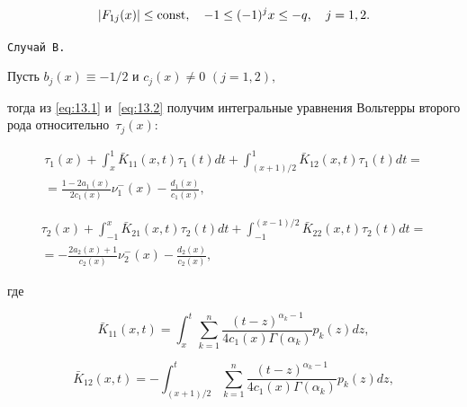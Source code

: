 \begin{equation}

| F_{1j}(x) | \le {\rm const},\quad  -1\leq(-1)^{j}x\leq -q, \quad  j = 1, 2. \label{eq:28.1.j}

\end{equation}



\smallskip



\hypertarget{abd:B}{}



\texttt{Случай B.}

Пусть ${b_j}(x) \equiv  - {1}/{2}$ и ${c_j}(x) \ne 0$ $(j = 1, 2),$ 

тогда из \eqref{eq:13.1} и~\eqref{eq:13.2} получим интегральные уравнения Вольтерры второго рода относительно~${\tau _j}(x)$:

\begin{multline}

{\tau _1}(x) +  \int _x^1 {{{\bar K}_{11}}(x,t){\tau _1}(t)dt}  +  \int _{({{x + 1}})/{2}}^1 {{{\bar K}_{12}}(x,t){\tau _1}(t)dt} =

\\

 = \frac{{1 - 2{a_1}(x)}}{{2{c_1}(x)}}\nu _1^ - (x) - \frac{{{d_1}(x)}}{{{c_1}(x)}}, \label{eq:29.1}

\end{multline}

\begin{multline}

{\tau _2}(x) +  \int _{ - 1}^x {{{\bar K}_{21}}(x,t){\tau _2}(t)dt}  +  \int _{ - 1}^{({{x - 1}})/{2}} {{{\bar K}_{22}}(x,t){\tau _2}(t)dt} =

\\  =  - \frac{{2{a_2}(x) + 1}}{{{c_2}(x)}}\nu _2^ - (x) - \frac{{{d_2}(x)}}{{{c_2}(x)}},\label{eq:29.2}

\end{multline}

где

$$

{\bar K_{11}}(x,t) =  \int _x^t {\sum\limits_{k = 1}^n {\frac{{{{(t - z)}^{{\alpha _k} - 1}}}}{{4{c_1}(x)\Gamma ({\alpha _k})}}} {p_k}(z)dz},$$

$$ 

{\bar K_{12}}(x,t) =  -  \int _{({{x + 1}})/{2}}^t {\sum\limits_{k = 1}^n {\frac{{{{(t - z)}^{{\alpha _k} - 1}}}}{{4{c_1}(x)\Gamma ({\alpha _k})}}} {p_k}(z)dz},

$$


